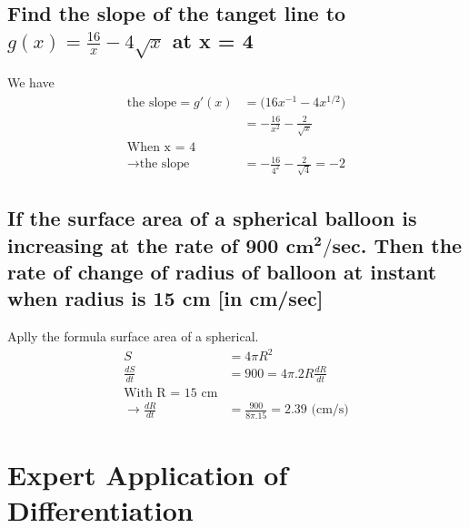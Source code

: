 \documentclass{article}
\begin{document}
\begin{multicols}{2}
\subsection{Find the slope of the tanget line to $g(x)=\frac{16}{x}-4\sqrt{x}$ at x = 4}
We have
\begin{align*}
    \text{the slope} = g'(x) &= \Big(16x^{-1} - 4x^{1/2}\Big) \\
                            &= -\frac{16}{x^2} - \frac{2}{\sqrt{x}} \\
    \text{When x = 4} \\
    \rightarrow \text{the slope} &= -\frac{16}{4^2} - \frac{2}{\sqrt{4}} = -2
\end{align*}


\subsection{If the surface area of a spherical balloon is increasing at the rate of 900 $\mathbf{cm^2/sec}$. Then the rate of change of radius of balloon at instant when radius is 15 cm [in cm/sec]}
Aplly the formula surface area of a spherical.
\begin{align*}
    S &= 4\pi R^2 \\
    \frac{dS}{dt} &= 900 = 4\pi.2R\frac{dR}{dt} \\
    \text{With R = 15 cm} \\
    \rightarrow \frac{dR}{dt} &= \frac{900}{8\pi . 15} = 2.39 \text{ (cm/s)}
\end{align*}

\end{multicols}


\section{Expert Application of Differentiation}
\end{document}
